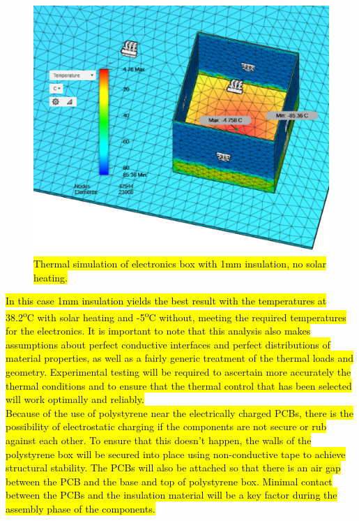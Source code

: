 	\begin{figure}[H]
    \centering  
    \includegraphics[scale=0.65]{4-experiment-design/img/mechanical/1mmthicknoheat.PNG}
	\caption{\hl{Thermal simulation of electronics box with 1mm insulation, no solar heating.}}
	\label{fig:1mmthicknoheat}    
    	\end{figure}
	
\hl{In this case 1mm insulation yields the best result with the temperatures at 38.2\textsuperscript{o}C with solar heating and -5\textsuperscript{o}C without, meeting the required temperatures for the electronics. It is important to note that this analysis also makes assumptions about perfect conductive interfaces and perfect distributions of material properties, as well as a fairly generic treatment of the thermal loads and geometry. Experimental testing will be required to ascertain more accurately the thermal conditions and to ensure that the thermal control that has been selected will work optimally and reliably.} \\

\hl{Because of the use of polystyrene near the electrically charged PCBs, there is the possibility of electrostatic charging if the components are not secure or rub against each other. To ensure that this doesn't happen, the walls of the polystyrene box will be secured into place using non-conductive tape to achieve structural stability. The PCBs will also be attached so that there is an air gap between the PCB and the base and top of polystyrene box. Minimal contact between the PCBs and the insulation material will be a key factor during the assembly phase of the components.}


